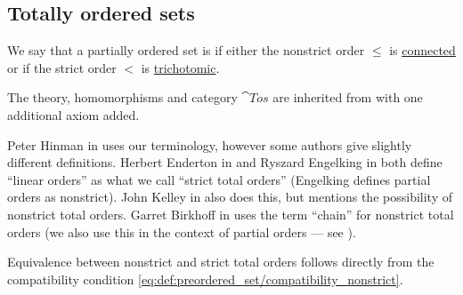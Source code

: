 \subsection{Totally ordered sets}\label{subsec:totally_ordered_sets}

\begin{definition}\label{def:totally_ordered_set}\cite[def. 2.1.1(ii)]{Hinman2005}
  We say that a partially ordered set is  if either the nonstrict order \( \leq \) is \hyperref[def:binary_relation/connected]{connected} or if the strict order \( < \) is \hyperref[def:binary_relation/trichotomic]{trichotomic}.

  The theory, homomorphisms and category \( \cat{Tos} \) are inherited from  with one additional axiom added.
\end{definition}
\begin{comments}
  \item Peter Hinman in \cite[def. 2.1.1(ii)]{Hinman2005} uses our terminology, however some authors give slightly different definitions. Herbert Enderton in \cite[62]{Enderton1977Sets} and Ryszard Engelking in \cite[4]{Engelking1989} both define \enquote{linear orders} as what we call \enquote{strict total orders} (Engelking defines partial orders as nonstrict). John Kelley in \cite[14]{Kelley1975} also does this, but mentions the possibility of nonstrict total orders. Garret Birkhoff in \cite[def. I.6]{Birkhoff1948} uses the term \enquote{chain} for nonstrict total orders (we also use this in the context of partial orders --- see ).
\end{comments}
\begin{defproof}
  Equivalence between nonstrict and strict total orders follows directly from the compatibility condition \eqref{eq:def:preordered_set/compatibility_nonstrict}.
\end{defproof}

